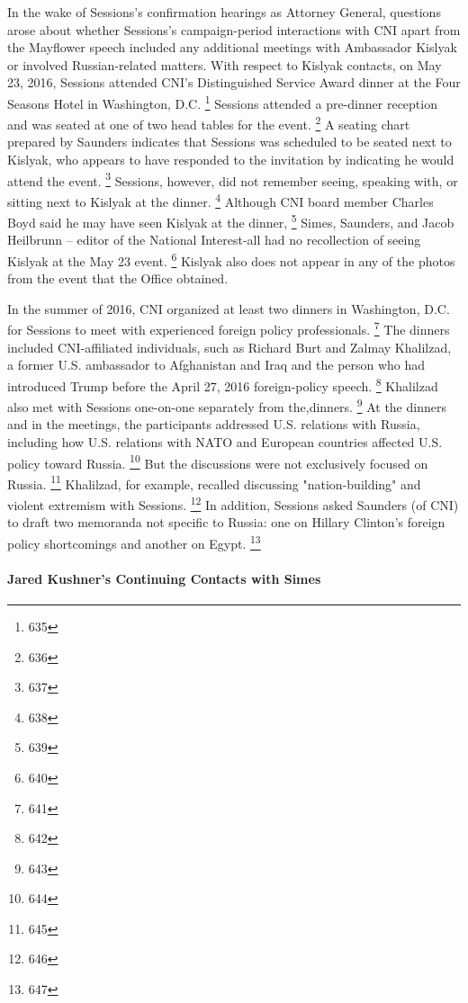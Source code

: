 In the wake of Sessions's confirmation hearings as Attorney General, questions arose about whether Sessions's campaign-period interactions with CNI apart from the Mayflower speech included any additional meetings with Ambassador Kislyak or involved Russian-related matters.
With respect to Kislyak contacts, on May 23, 2016, Sessions attended CNI's Distinguished Service Award dinner at the Four Seasons Hotel in Washington, D.C.%
\footnote{635}
Sessions attended a pre-dinner reception and was seated at one of two head tables for the event.%
\footnote{636}
A seating chart prepared by Saunders indicates that Sessions was scheduled to be seated next to Kislyak, who appears to have responded to the invitation by indicating he would attend the event.%
\footnote{637}
Sessions, however, did not remember seeing, speaking with, or sitting next to Kislyak at the dinner.%
\footnote{638}
Although CNI board member Charles Boyd said he may have seen Kislyak at the dinner,%
\footnote{639}
Simes, Saunders, and Jacob Heilbrunn -- editor of the National Interest-all had no recollection of seeing Kislyak at the May 23 event.%
\footnote{640}
Kislyak also does not appear in any of the photos from the event that the Office obtained.

In the summer of 2016, CNI organized at least two dinners in Washington, D.C. for Sessions to meet with experienced foreign policy professionals.%
\footnote{641}
The dinners included CNI-affiliated individuals, such as Richard Burt and Zalmay Khalilzad, a former U.S. ambassador to Afghanistan and Iraq and the person who had introduced Trump before the April 27, 2016 foreign-policy speech.%
\footnote{642}
Khalilzad also met with Sessions one-on-one separately from the,dinners.%
\footnote{643}
At the dinners and in the meetings, the participants addressed U.S. relations with Russia, including how U.S. relations with NATO and European countries affected U.S. policy toward Russia.%
\footnote{644}
But the discussions were not exclusively focused on Russia.%
\footnote{645}
Khalilzad, for example, recalled discussing "nation-building" and violent extremism with Sessions.%
\footnote{646}
In addition, Sessions asked Saunders (of CNI) to draft two memoranda not specific to Russia: one on Hillary Clinton's foreign policy shortcomings and another on Egypt.%
\footnote{647}

\paragraph{Jared Kushner's Continuing Contacts with Simes}

